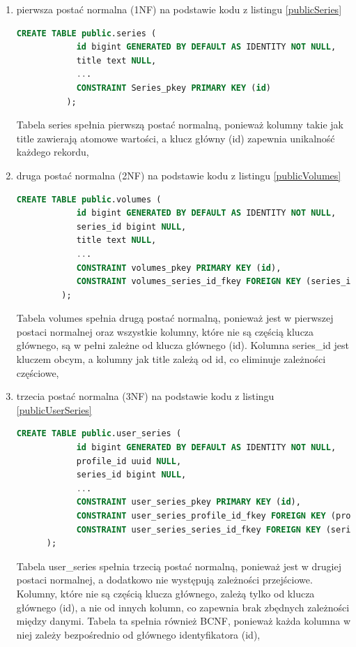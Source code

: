 \documentclass[12pt,twoside]{article}
\begin{document}
\begin{enumerate}[label=\alph*), leftmargin=1.25cm]
	\item pierwsza postać normalna (1NF) na podstawie kodu z listingu \ref{publicSeries}
	\begin{lstlisting}[language=SQL,caption=kod tworzenia tabeli series, label={publicSeries}]
		CREATE TABLE public.series (
			id bigint GENERATED BY DEFAULT AS IDENTITY NOT NULL,
			title text NULL,
			...
			CONSTRAINT Series_pkey PRIMARY KEY (id)
		  );
		\end{lstlisting}
		Tabela series spełnia pierwszą postać normalną, ponieważ kolumny takie jak title zawierają atomowe 
		wartości, a klucz główny (id) zapewnia unikalność każdego rekordu,

	\item druga postać normalna (2NF) na podstawie kodu z listingu \ref{publicVolumes}
	\begin{lstlisting}[language=SQL,caption=kod tworzenia tabeli volumes, label={publicVolumes}]
		CREATE TABLE public.volumes (
			id bigint GENERATED BY DEFAULT AS IDENTITY NOT NULL,
			series_id bigint NULL,
			title text NULL,
			...
			CONSTRAINT volumes_pkey PRIMARY KEY (id),
			CONSTRAINT volumes_series_id_fkey FOREIGN KEY (series_id) REFERENCES series(id)
	 	 );
		\end{lstlisting}
		Tabela volumes spełnia drugą postać normalną, ponieważ jest w pierwszej postaci normalnej oraz 
		wszystkie kolumny, które nie są częścią klucza głównego, są w pełni zależne od klucza głównego (id). 
		Kolumna series\_id jest kluczem obcym, a kolumny jak title zależą od id, co eliminuje zależności 
		częściowe,
	
	\item trzecia postać normalna (3NF) na podstawie kodu z listingu \ref{publicUserSeries}
	\begin{lstlisting}[language=SQL,caption=kod tworzenia tabeli user\_series, label={publicUserSeries}]
		CREATE TABLE public.user_series (
			id bigint GENERATED BY DEFAULT AS IDENTITY NOT NULL,
			profile_id uuid NULL,
			series_id bigint NULL,
			...
			CONSTRAINT user_series_pkey PRIMARY KEY (id),
			CONSTRAINT user_series_profile_id_fkey FOREIGN KEY (profile_id) REFERENCES profiles(id),
			CONSTRAINT user_series_series_id_fkey FOREIGN KEY (series_id) REFERENCES series(id)
	  );
		\end{lstlisting}
		Tabela user\_series spełnia trzecią postać normalną, ponieważ jest w drugiej postaci normalnej, a 
		dodatkowo nie występują zależności przejściowe. Kolumny, które nie są częścią klucza głównego, zależą 
		tylko od klucza głównego (id), a nie od innych kolumn, co zapewnia brak zbędnych zależności między danymi.
		Tabela ta spełnia również BCNF, ponieważ każda kolumna w niej zależy bezpośrednio od głównego identyfikatora 
		(id),
	

\end{enumerate}
\end{document}
